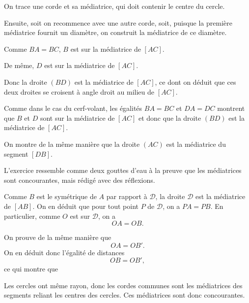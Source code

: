 \begin{Soln}{12}
On trace une corde et sa médiatrice, qui doit contenir le centre du cercle.

Ensuite, soit on recommence avec une autre corde, soit, puisque la première médiatrice fournit un diamètre, on construit la médiatrice de ce diamètre.
\end{Soln}
\begin{Soln}{13}
Comme $BA=BC$, $B$ est sur la médiatrice de $[AC]$.

De même, $D$ est sur la médiatrice de $[AC]$.

Donc la droite $(BD)$ est la médiatrice de $[AC]$, ce dont on déduit que ces deux droites se croisent à angle droit au milieu de $[AC]$.
\end{Soln}
\begin{Soln}{14}
Comme dans le cas du cerf-volant, les égalités $BA=BC$ et $DA=DC$ montrent que $B$ et $D$ sont sur la médiatrice de $[AC]$ et donc que la droite $(BD)$ est la médiatrice de $[AC]$.

On montre de la même manière que la droite $(AC)$ est la médiatrice du segment $[DB]$.
\end{Soln}
\begin{Soln}{15}
L'exercice ressemble comme deux gouttes d'eau à la preuve que les médiatrices sont concourantes, mais rédigé avec des réflexions.

Comme $B$ est le symétrique de $A$ par rapport à $\mathcal D$, la droite $\mathcal D$ est la médiatrice de $[AB]$. On en déduit que pour tout point $P$ de $\mathcal D$, on a $PA=PB$. En particulier, comme $O$ est sur $\mathcal D$, on a
\[ OA=OB.\]

On prouve de la même manière que
\[OA=OB'.\]
On en déduit donc  l'égalité de distances
\[OB=OB',\]
ce qui montre que 
\end{Soln}
\begin{Soln}{16}
Les cercles ont même rayon, donc les cordes communes sont les médiatrices des segments reliant les centres des cercles. Ces médiatrices sont donc concourantes.
\end{Soln}
